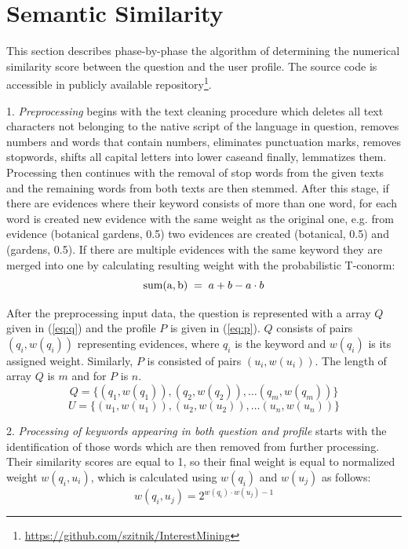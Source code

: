 \documentclass[conference]{IEEEtran}
\begin{document}
\section{Semantic Similarity}
\label{sec:alg}
This section describes phase-by-phase the algorithm of determining the numerical similarity score between the question and the user profile. The source code is accessible in publicly available repository\footnote{\url{https://github.com/szitnik/InterestMining}}.
	
1. {\it Preprocessing} begins with the text cleaning procedure which deletes all text characters not belonging to the native script of the language in question, removes numbers and words that contain numbers, eliminates punctuation marks, removes stopwords, shifts all capital letters into lower caseand finally, lemmatizes them. Processing then continues with the removal of stop words from the given texts and the remaining words from both texts are then stemmed. After this stage, if there are evidences where their keyword consists of more than one word, for each word is created new evidence with the same weight as the original one, e.g. from evidence (botanical gardens, 0.5) two evidences are created (botanical, 0.5) and (gardens, 0.5). If there are multiple evidences with the same keyword they are merged into one by calculating resulting weight with the probabilistic T-conorm: 
\begin{equation}
	\label{eq:tconorm}
	{\rm sum(a,b)}\;=\;a+b-a\cdot b
\end{equation}

After the preprocessing input data, the question is represented with a array $Q$ given in (\ref{eq:q}) and the profile $P$ is given in (\ref{eq:p}). $Q$ consists of pairs $(q_i,w(q_i))$ representing evidences, where $q_i$ is the keyword and $w(q_i)$ is its assigned weight. Similarly, $P$ is consisted of pairs $(u_i,w(u_i))$. The length of array $Q$ is $m$ and for $P$ is $n$.
\begin{equation}
	\label{eq:q}
	Q = \{(q_1,w(q_1)),(q_2,w(q_2)),\ldots(q_m,w(q_m))\}
\end{equation} 
\begin{equation}
	\label{eq:p}
	U=\{(u_1,w(u_1)),(u_2,w(u_2)),\ldots(u_n,w(u_n))\}
\end{equation}

    
2. {\it Processing of keywords appearing in both question and profile} starts with the identification of those words which are then removed from further processing. Their similarity scores are equal to 1, so their final weight is equal to normalized weight $w(q_i,u_i)$, which is calculated using $w(q_i)$ and $w(u_j)$ as follows:
\begin{equation}
	\label{eq:w}
	w(q_i,u_j)=2^{w(q_i)\cdot w(u_j)-1}
\end{equation}
\end{document}
